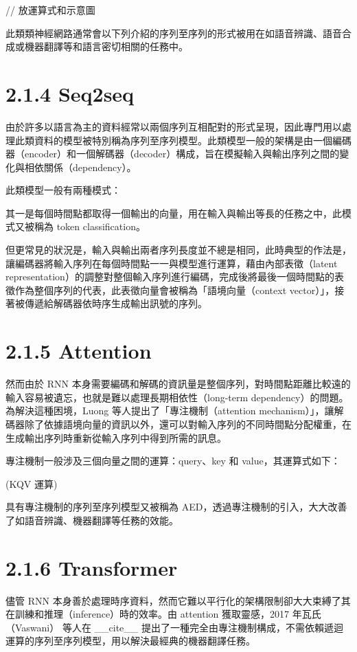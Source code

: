 // 放運算式和示意圖

此類類神經網路通常會以下列介紹的序列至序列的形式被用在如語音辨識、語音合成或機器翻譯等和語言密切相關的任務中。

\section{2.1.4 Seq2seq}

由於許多以語言為主的資料經常以兩個序列互相配對的形式呈現，因此專門用以處理此類資料的模型被特別稱為序列至序列模型。此類模型一般的架構是由一個編碼器（encoder）和一個解碼器（decoder）構成，旨在模擬輸入與輸出序列之間的變化與相依關係（dependency）。

此類模型一般有兩種模式：

其一是每個時間點都取得一個輸出的向量，用在輸入與輸出等長的任務之中，此模式又被稱為 token classification。

但更常見的狀況是，輸入與輸出兩者序列長度並不總是相同，此時典型的作法是，讓編碼器將輸入序列在每個時間點一一與模型進行運算，藉由內部表徵（latent representation）的調整對整個輸入序列進行編碼，完成後將最後一個時間點的表徵作為整個序列的代表，此表徵向量會被稱為「語境向量（context vector）」，接著被傳遞給解碼器依時序生成輸出訊號的序列。

\section{2.1.5 Attention}

然而由於 RNN 本身需要編碼和解碼的資訊量是整個序列，對時間點距離比較遠的輸入容易被遺忘，也就是難以處理長期相依性（long-term dependency）的問題。為解決這種困境，Luong 等人提出了「專注機制（attention mechanism）」，讓解碼器除了依據語境向量的資訊以外，還可以對輸入序列的不同時間點分配權重，在生成輸出序列時重新從輸入序列中得到所需的訊息。

專注機制一般涉及三個向量之間的運算：query、key 和 value，其運算式如下：

(KQV 運算)

具有專注機制的序列至序列模型又被稱為 AED，透過專注機制的引入，大大改善了如語音辨識、機器翻譯等任務的效能。

\section{2.1.6 Transformer}

儘管 RNN 本身善於處理時序資料，然而它難以平行化的架構限制卻大大束縛了其在訓練和推理（inference）時的效率。由 attention 獲取靈感，2017 年瓦氏（Vaswani） 等人在 \_\_cite\_\_ 提出了一種完全由專注機制構成，不需依賴遞迴運算的序列至序列模型，用以解決最經典的機器翻譯任務。

